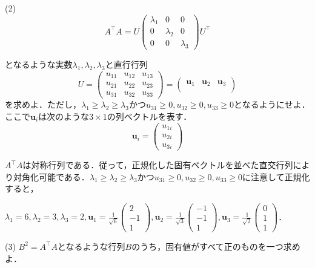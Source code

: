 \documentclass[a4j]{jarticle}
\let \ds \displaystyle
\begin{document}
\begin{screen}
(2)
$$ A^\top A=U\begin{pmatrix}
\lambda_1& 0&  0\\
0&  \lambda_2& 0\\
0& 0&  \lambda_3
\end{pmatrix}
U^\top $$

となるような実数$\lambda_1,\lambda_2,\lambda_3$と直行行列
$$ U=\begin{pmatrix}
u_{11} & u_{12} & u_{13} \\
u_{21} & u_{22} & u_{23} \\
u_{31} & u_{32} & u_{33}
\end{pmatrix}
=\begin{pmatrix}
\bm{u}_1 & \bm{u}_2 & \bm{u}_3 \\
\end{pmatrix}
$$
を求めよ．ただし，$\lambda_1\geq\lambda_2\geq \lambda_3$かつ$u_{31} \geq 0 ,u_{32} \geq 0, u_{33}\geq 0$となるようにせよ．ここで$\bm{u}_i$は次のような$3 \times 1$の列ベクトルを表す．
$$ \bm{u}_i = \left(\begin{array}{c} u_{1i}\\ u_{2i} \\ u_{3i} \end{array} \right)$$
\end{screen}


$A^\top A$は対称行列である．従って，正規化した固有ベクトルを並べた直交行列により対角化可能である．$\lambda_1\geq\lambda_2\geq \lambda_3$かつ$u_{31} \geq 0 ,u_{32} \geq 0, u_{33}\geq 0$に注意して正規化すると，

$\lambda_1=6,\lambda_2=3 ,\lambda_3=2,
\ds
\bm{u}_1 = \frac{1}{\sqrt{6}}\left(\begin{array}{c} 2\\ -1 \\ 1 \end{array} \right),
\bm{u}_2 = \frac{1}{\sqrt{3}}\left(\begin{array}{c} -1 \\ -1 \\ 1 \end{array} \right),
\bm{u}_3 = \frac{1}{\sqrt{2}}\left(\begin{array}{c} 0\\ 1 \\ 1 \end{array} \right)
$．


\begin{screen}
(3)
$B^2=A^\top A$となるような行列$B$のうち，固有値がすべて正のものを一つ求めよ．
\end{screen}
\end{document}
